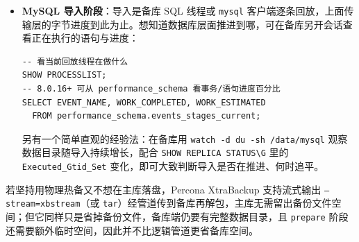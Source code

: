 \documentclass[12pt,UTF8]{ctexbook}
\begin{document}
\begin{itemize}[leftmargin=2cm]
\begin{lstlisting}
# 本地落盘：pv 放 gzip 之后，-s 用压缩后估算
mysqldump -uroot -p --all-databases --single-transaction \
  --triggers --routines --events --set-gtid-purged=ON \
  | gzip -1 | pv -s 60G > /data/full_backup.sql.gz

# 流式直导到备库：同样把 pv 放 gzip 之后
mysqldump -uroot -p --all-databases --single-transaction \
  --set-gtid-purged=ON \
  | gzip -1 | pv -s 40G | ssh root@192.168.4.101 \
    "gunzip | mysql -uroot -p -h127.0.0.1"
# pv 输出形如：12.4GB 0:15:32 [13.6MB/s] [====>    ] 31% ETA 0:34:10
\end{lstlisting}

若未装 \texttt{pv}（\texttt{apt install pv}），或处于离线环境装不了，本地落盘时另开一个终端盯文件大小增长即可，零安装：

\begin{lstlisting}
watch -n 5 'ls -lh /data/full_backup.sql.gz'
# 或只看占用：watch -d du -sh /data/full_backup.sql.gz
\end{lstlisting}

这能看到“文件已经写了多少、还在不在涨”，配合事先估算的目标体积（压缩后 40--75\,GB）判断进度。流式直导那种不落盘的场景没有文件可看，只能退而求其次用 \texttt{ss -tunp} 看该 SSH 连接的实时收发字节数，或 \texttt{iftop}/\texttt{nload} 看网卡总流量——但它们看不到“导出进行了多少”这样的业务进度。

  \item \textbf{MySQL 导入阶段}：导入是备库 SQL 线程或 \texttt{mysql} 客户端逐条回放，上面传输层的字节进度到此为止。想知道数据库层面推进到哪，可在备库另开会话查看正在执行的语句与进度：

\begin{lstlisting}
-- 看当前回放线程在做什么
SHOW PROCESSLIST;
-- 8.0.16+ 可从 performance_schema 看事务/语句进度百分比
SELECT EVENT_NAME, WORK_COMPLETED, WORK_ESTIMATED
  FROM performance_schema.events_stages_current;
\end{lstlisting}

另有一个简单直观的经验法：在备库用 \texttt{watch -d du -sh /data/mysql} 观察数据目录随导入持续增长，配合 \texttt{SHOW REPLICA STATUS\textbackslash{}G} 里的 \texttt{Executed\_Gtid\_Set} 变化，即可大致判断导入是否在推进、何时追平。

\end{itemize}

若坚持用物理热备又不想在主库落盘，Percona XtraBackup 支持流式输出 \texttt{--stream=xbstream}（或 \texttt{tar}）经管道传到备库再解包，主库无需留出备份文件空间；但它同样只是省掉备份文件，备库端仍要有完整数据目录，且 \texttt{prepare} 阶段还需要额外临时空间，因此并不比逻辑管道更省备库空间。
\end{document}
